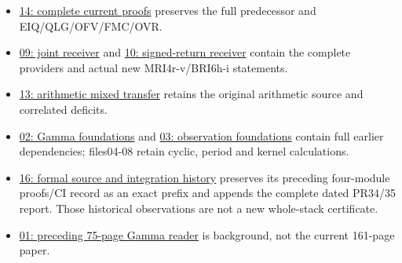 \documentclass[
]{article}
\providecommand{\tightlist}{%
  \setlength{\itemsep}{0pt}\setlength{\parskip}{0pt}}
\begin{document}
\begin{itemize}
\tightlist
\item
  \href{https://github.com/KokunoYumeto/zeta-function-research-reader/blob/main/workbenches/splitzero-tandem/continuations/20260915-first-variation-continuation/14_CURRENT_KERNEL_AND_MULTIPLICITY_PROOFS.tex}{14:
  complete current proofs} preserves the full predecessor and
  EIQ/QLG/OFV/FMC/OVR.
\item
  \href{https://github.com/KokunoYumeto/zeta-function-research-reader/blob/main/workbenches/splitzero-tandem/continuations/20260915-first-variation-continuation/09_UPDATED_JOINT_NOTE.tex}{09:
  joint receiver} and
  \href{https://github.com/KokunoYumeto/zeta-function-research-reader/blob/main/workbenches/splitzero-tandem/continuations/20260915-first-variation-continuation/10_UPDATED_SIGNED_RETURN.tex}{10:
  signed-return receiver} contain the complete providers and actual new
  MRI4r-v/BRI6h-i statements.
\item
  \href{https://github.com/KokunoYumeto/zeta-function-research-reader/blob/main/workbenches/splitzero-tandem/continuations/20260915-first-variation-continuation/13_ARITHMETIC_MIXED_TRANSFER.tex}{13:
  arithmetic mixed transfer} retains the original arithmetic source and
  correlated deficits.
\item
  \href{https://github.com/KokunoYumeto/zeta-function-research-reader/blob/main/workbenches/splitzero-tandem/continuations/20260915-first-variation-continuation/02_FULL_GAMMA_PROOFS.tex}{02:
  Gamma foundations} and
  \href{https://github.com/KokunoYumeto/zeta-function-research-reader/blob/main/workbenches/splitzero-tandem/continuations/20260915-first-variation-continuation/03_FULL_OBSERVATION_PROOFS.tex}{03:
  observation foundations} contain full earlier dependencies; files04-08
  retain cyclic, period and kernel calculations.
\item
  \href{https://github.com/KokunoYumeto/zeta-function-research-reader/blob/main/workbenches/splitzero-tandem/continuations/20260915-first-variation-continuation/16_PR32_FORMAL_SOURCE_AND_PROOFS.md}{16:
  formal source and integration history} preserves its preceding
  four-module proofs/CI record as an exact prefix and appends the
  complete dated PR34/35 report. Those historical observations are not a
  new whole-stack certificate.
\item
  \href{https://github.com/KokunoYumeto/zeta-function-research-reader/blob/main/workbenches/splitzero-tandem/continuations/20260915-first-variation-continuation/01_GAMMA_READER.pdf}{01:
  preceding 75-page Gamma reader} is background, not the current
  161-page paper.
\end{itemize}
\end{document}
